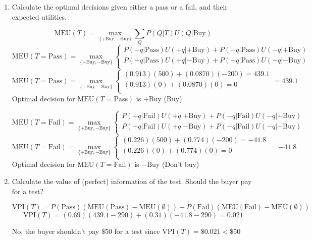 \documentclass[12pt]{article}
\begin{document}
\begin{enumerate}
\item Calculate the optimal decisions given either a pass or a fail,
  and their expected utilities.

  \[
    \text{MEU}(T) = \max_{\{+\text{Buy}, -\text{Buy}\}}{\sum_{Q}P(Q|T)U(Q|\text{Buy})}
  \]
  \[
    \text{MEU}(T=\text{Pass}) = \max_{\{+\text{Buy}, -\text{Buy}\}}
    \begin{cases}
      P(+q|\text{Pass})U(+q|+\text{Buy}) + P(-q|\text{Pass})U(-q|+\text{Buy}) \\
      P(+q|\text{Pass})U(+q|-\text{Buy}) + P(-q|\text{Pass})U(-q|-\text{Buy}) \\
    \end{cases}
  \]
  \[
    \text{MEU}(T=\text{Pass}) = \max_{\{+\text{Buy}, -\text{Buy}\}}
    \begin{cases}
      (0.913)(500) + (0.0870)(-200) = 439.1 \\
      (0.913)(0) + (0.0870)(0) = 0 \\
    \end{cases}
    = 439.1
  \]
  Optimal decision for $\text{MEU}(T=\text{Pass})$ is $+\text{Buy}$ (Buy)


  \[
    \text{MEU}(T=\text{Fail}) = \max_{\{+\text{Buy}, -\text{Buy}\}}
    \begin{cases}
      P(+q|\text{Fail})U(+q|+\text{Buy}) + P(-q|\text{Fail})U(-q|+\text{Buy}) \\
      P(+q|\text{Fail})U(+q|-\text{Buy}) + P(-q|\text{Fail})U(-q|-\text{Buy}) \\
    \end{cases}
  \]
  \[
    \text{MEU}(T=\text{Fail}) = \max_{\{+\text{Buy}, -\text{Buy}\}}
    \begin{cases}
      (0.226)(500) + (0.774)(-200) = -41.8 \\
      (0.226)(0) + (0.774)(0) = 0 \\
    \end{cases}
    = -41.8
  \]
  Optimal decision for $\text{MEU}(T=\text{Fail})$ is $-\text{Buy}$ (Don't buy)

\item Calculate the value of (perfect) information of the test. Should
  the buyer pay for a test?

  \[
    \text{VPI}(T) = P(\text{Pass})(\text{MEU}(\text{Pass}) - \text{MEU}(\emptyset)) + P(\text{Fail})(\text{MEU}(\text{Fail}) - \text{MEU}(\emptyset))
  \]
  \[
    \text{VPI}(T) = (0.69)(439.1-290) + (0.31)(-41.8-290) = 0.021
  \]

  No, the buyer shouldn't pay \$50 for a test since $\text{VPI}(T) = \$ 0.021 < \$ 50$

\end{enumerate}
\end{document}
